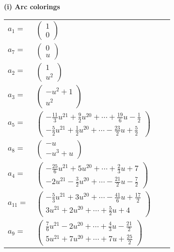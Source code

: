 \documentclass[1p]{elsarticle_modified}
\theoremstyle{definition}
\begin{document}
\flushleft \textbf{(i) Arc colorings}\\
\begin{tabular}{m{7pt} m{180pt} m{7pt} m{180pt} }
\flushright $a_{1}=$&$\begin{pmatrix}1\\0\end{pmatrix}$ \\
\flushright $a_{7}=$&$\begin{pmatrix}0\\u\end{pmatrix}$ \\
\flushright $a_{2}=$&$\begin{pmatrix}1\\u^2\end{pmatrix}$ \\
\flushright $a_{3}=$&$\begin{pmatrix}- u^2+1\\u^2\end{pmatrix}$ \\
\flushright $a_{5}=$&$\begin{pmatrix}-\frac{11}{3} u^{21}+\frac{9}{2} u^{20}+\cdots+\frac{19}{6} u-\frac{1}{2}\\-\frac{5}{2} u^{21}+\frac{1}{2} u^{20}+\cdots-\frac{23}{2} u+\frac{5}{2}\end{pmatrix}$ \\
\flushright $a_{8}=$&$\begin{pmatrix}- u\\- u^3+u\end{pmatrix}$ \\
\flushright $a_{4}=$&$\begin{pmatrix}-\frac{25}{6} u^{21}+5 u^{20}+\cdots+\frac{2}{3} u+7\\-2 u^{21}-\frac{3}{2} u^{20}+\cdots-\frac{21}{2} u-\frac{7}{2}\end{pmatrix}$ \\
\flushright $a_{11}=$&$\begin{pmatrix}-\frac{5}{3} u^{21}+3 u^{20}+\cdots-\frac{41}{6} u+\frac{17}{2}\\3 u^{21}+2 u^{20}+\cdots+\frac{5}{2} u+4\end{pmatrix}$ \\
\flushright $a_{9}=$&$\begin{pmatrix}\frac{7}{6} u^{21}-2 u^{20}+\cdots+\frac{4}{3} u-\frac{21}{2}\\5 u^{21}+7 u^{20}+\cdots+7 u+\frac{25}{2}\end{pmatrix}$ \\

\end{tabular}
\end{document}
